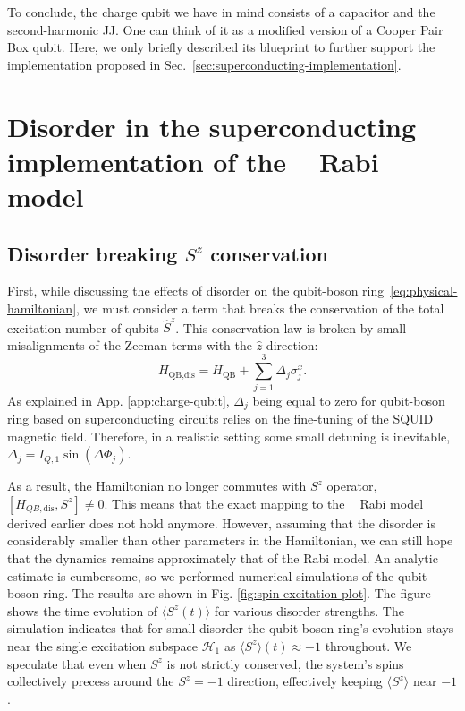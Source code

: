 \documentclass[reprint, aps, prx, amsmath, amssymb, longbibliography, superscriptaddress]{revtex4-2}
\DeclareMathOperator{\Zthree}{\mathbb{Z}_3}
\begin{document}
To conclude, the charge qubit we have in mind consists of a capacitor and the second-harmonic JJ. One can think of it as a modified version of a Cooper Pair Box qubit. Here, we only briefly described its blueprint to further support the implementation proposed in Sec.~\ref{sec:superconducting-implementation}.


\section{Disorder in the superconducting implementation of the \texorpdfstring{$\Zthree$}{Z3} Rabi model}
\label{app:disorder}
\subsection{Disorder breaking \texorpdfstring{$S^z$}{Z\^z} conservation}

First, while discussing the effects of disorder on the qubit-boson ring~\eqref{eq:physical-hamiltonian}, we must consider a term that breaks the conservation of the total excitation number of qubits $\hat S^z$. This conservation law is broken by small misalignments of the Zeeman terms with the $\hat z$ direction:
\begin{equation}
    H_{\text{QB,dis}} = H_{\text{QB}} + \sum_{j=1}^3 \Delta_j \sigma^x_{j}.
\end{equation}
As explained in App. \ref{app:charge-qubit}, $\Delta_j$ being equal to zero for qubit-boson ring based on superconducting circuits relies on the fine-tuning of the SQUID magnetic field. Therefore, in a realistic setting some small detuning is inevitable, $\Delta_j = I_{Q,1}\sin(\Delta \Phi_j)$.

As a result, the Hamiltonian no longer commutes with $S^z$ operator, $[H_{QB,\text{dis}}, S^z] \neq 0 $. This means that the exact mapping to the $\Zthree$ Rabi model derived earlier does not hold anymore. However, assuming that the disorder is considerably smaller than other parameters in the Hamiltonian, we can still hope that the dynamics remains approximately that of the Rabi model. An analytic estimate is cumbersome, so we performed numerical simulations of the qubit–boson ring. The results are shown in Fig. \ref{fig:spin-excitation-plot}. The figure shows the time evolution of $\langle S^z(t)\rangle$ for various disorder strengths. The simulation indicates that for small disorder the qubit-boson ring's evolution stays near the single excitation subspace $\mathcal{H}_1$ as $\langle S^z \rangle(t) \approx -1$ throughout. We speculate that even when $S^z$ is not strictly conserved, the system’s spins collectively precess around the $S^z=-1$ direction, effectively keeping $\langle S^z \rangle$ near $-1$. 
\end{document}
